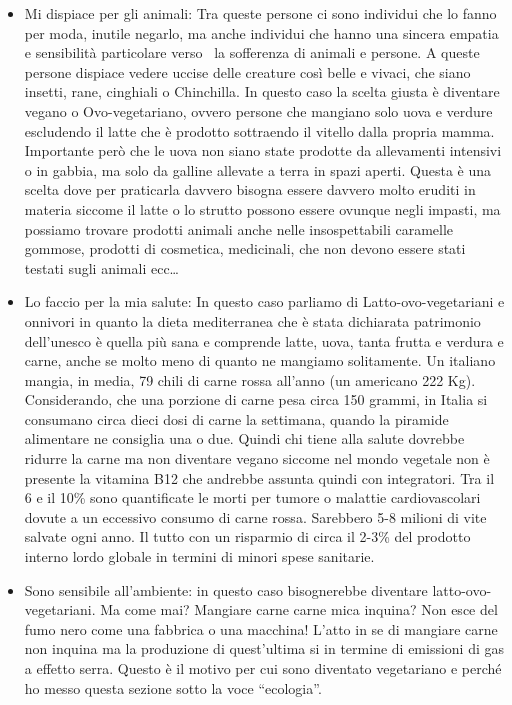 \documentclass[12pt]{book} %
\begin{document}
\begin{itemize}
\item Mi dispiace per gli animali: Tra queste persone ci sono individui che lo fanno per moda, inutile negarlo, ma anche
individui che hanno una sincera empatia e sensibilità particolare verso \ la sofferenza di animali e persone. A queste
persone dispiace vedere uccise delle creature così belle e vivaci, che siano insetti, rane, cinghiali o Chinchilla. In
questo caso la scelta giusta è diventare vegano o Ovo-vegetariano, ovvero persone che mangiano solo uova e verdure
escludendo il latte che è prodotto sottraendo il vitello dalla propria mamma. Importante però che le uova non siano
state prodotte da allevamenti intensivi o in gabbia, ma solo da galline allevate a terra in spazi aperti. Questa è una
scelta dove per praticarla davvero bisogna essere davvero molto eruditi in materia siccome il latte o lo strutto
possono essere ovunque negli impasti, ma possiamo trovare prodotti animali anche nelle insospettabili caramelle
gommose, prodotti di cosmetica, medicinali, che non devono essere stati testati sugli animali ecc…
\item Lo faccio per la mia salute: In questo caso parliamo di Latto-ovo-vegetariani e onnivori in quanto la dieta
mediterranea che è stata dichiarata patrimonio
dell'unesco è quella più sana
e comprende latte, uova, tanta frutta e verdura e carne, anche se molto meno di quanto ne mangiamo solitamente. Un
italiano mangia, in media, 79 chili di carne rossa all'anno (un americano 222 Kg). Considerando,
che una porzione di carne pesa circa 150 grammi, in Italia si consumano circa dieci dosi di carne la settimana, quando
la piramide alimentare ne consiglia una o due. Quindi chi tiene alla salute dovrebbe ridurre la carne ma non diventare
vegano siccome nel mondo vegetale non è presente la vitamina B12 che andrebbe assunta quindi con integratori. Tra il 6
e il 10\% sono quantificate le morti per tumore o malattie cardiovascolari dovute a un eccessivo consumo di carne
rossa. Sarebbero 5-8 milioni di vite salvate ogni anno. Il tutto con un risparmio di circa il 2-3\% del prodotto
interno lordo globale in termini di minori spese sanitarie.
\item Sono sensibile all'ambiente: in questo caso bisognerebbe diventare latto-ovo-vegetariani. Ma
come mai? Mangiare carne carne mica inquina? Non esce del fumo nero come una fabbrica o una macchina!
L'atto in se di mangiare carne non inquina ma la produzione di quest'ultima
si in termine di emissioni di gas a effetto serra. Questo è il motivo per cui sono diventato vegetariano e perché ho
messo questa sezione sotto la voce “ecologia”.
\end{itemize}
\end{document}
